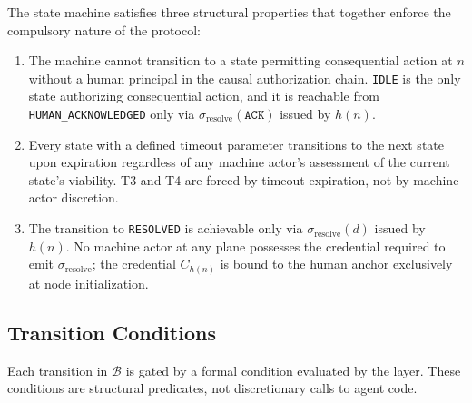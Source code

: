 \medskip
The state machine satisfies three structural properties that together enforce the compulsory nature of the protocol:

\begin{enumerate}\itemsep=0pt
\item[\textbf{(SP-1) Non-regression.}] The machine cannot transition to a state permitting consequential action at $n$ without a human principal in the causal authorization chain. \texttt{IDLE} is the only state authorizing consequential action, and it is reachable from \texttt{HUMAN\_ACKNOWLEDGED} only via $\sigma_{\text{resolve}}(\texttt{ACK})$ issued by $h(n)$.

\item[\textbf{(SP-2) Timeout-forced progression.}] Every state with a defined timeout parameter transitions to the next state upon expiration regardless of any machine actor's assessment of the current state's viability. T3 and T4 are forced by timeout expiration, not by machine-actor discretion.

\item[\textbf{(SP-3) Human-only resolution.}] The transition to \texttt{RESOLVED} is achievable only via $\sigma_{\text{resolve}}(d)$ issued by $h(n)$. No machine actor at any plane possesses the credential required to emit $\sigma_{\text{resolve}}$; the credential $C_{h(n)}$ is bound to the human anchor exclusively at node initialization.
\end{enumerate}

\subsection{Transition Conditions}
\label{sec:bp-transitions-conditions}

Each transition in $\mathcal{B}$ is gated by a formal condition evaluated by the \fact{} layer. These conditions are structural predicates, not discretionary calls to agent code.

